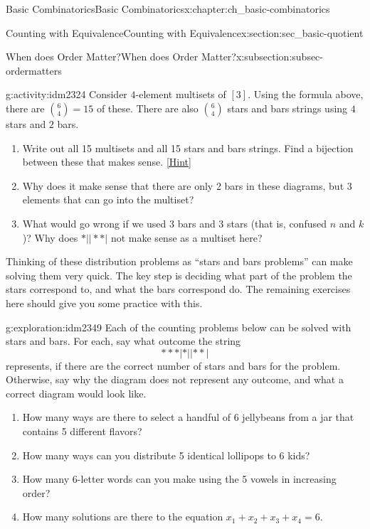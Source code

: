 \documentclass[oneside,10pt,]{book}
\numberwithin{equation}{chapter}
\begin{document}
\begin{chapterptx}{Basic Combinatorics}{}{Basic Combinatorics}{}{}{x:chapter:ch_basic-combinatorics}
\begin{sectionptx}{Counting with Equivalence}{}{Counting with Equivalence}{}{}{x:section:sec_basic-quotient}
\begin{subsectionptx}{When does Order Matter?}{}{When does Order Matter?}{}{}{x:subsection:subsec-ordermatters}
\begin{activity}{}{g:activity:idm2324}%
Consider \(4\)-element multisets of \([3]\).  Using the formula above, there are \(\binom{6}{4} = 15\) of these.  There are also \(\binom{6}{4}\) stars and bars strings using \(4\) stars and \(2\) bars.%
\begin{enumerate}[font=\bfseries,label=(\alph*),ref=\alph*]
\item{}Write out all 15 multisets and all 15 stars and bars strings.  Find a bijection between these that makes sense.%
\space\hspace*{0pt}\hfill{\tiny\hyperlink{g:hint:idm2336-back}{[Hint]}}\item{}Why does it make sense that there are only 2 bars in these diagrams, but 3 elements that can go into the multiset?%
\item{}What would go wrong if we used 3 bars and 3 stars (that is, confused \(n\) and \(k\))?  Why does \(*||**|\) not make sense as a multiset here?%
\end{enumerate}
\end{activity}
Thinking of these distribution problems as ``stars and bars problems'' can make solving them very quick.  The key step is deciding what part of the problem the stars correspond to, and what the bars correspond do.  The remaining exercises here should give you some practice with this.%
\begin{exploration}{}{g:exploration:idm2349}%
Each of the counting problems below can be solved with stars and bars. For each, say what outcome the string%
\begin{equation*}
***|*||**|
\end{equation*}
represents, if there are the correct number of stars and bars for the problem. Otherwise, say why the diagram does not represent any outcome, and what a correct diagram would look like.%
\begin{enumerate}
\item{}How many ways are there to select a handful of 6 jellybeans from a jar that contains 5 different flavors?%
\item{}How many ways can you distribute 5 identical lollipops to 6 kids?%
\item{}How many 6-letter words can you make using the 5 vowels in increasing order?%
\item{}How many solutions are there to the equation \(x_1 + x_2 + x_3 + x_4 = 6\).%
\end{enumerate}
%
\end{exploration}

\end{subsectionptx}
\end{sectionptx}
\end{chapterptx}
\end{document}
